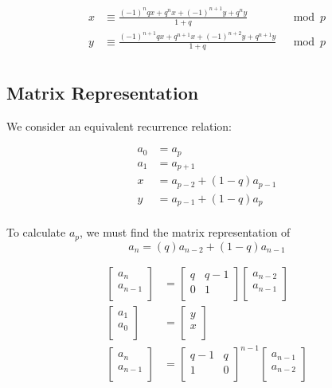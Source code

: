 \documentclass[paper.tex]{subfiles}
\begin{document}
\begin{align*}
	x &\equiv \frac{(-1)^nqx+q^nx+(-1)^{n+1}y+q^ny}{1+q} & \mod{p} \\
	y &\equiv \frac{(-1)^{n+1}qx+q^{n+1}x+(-1)^{n+2}y+q^{n+1}y}{1+q} & \mod{p} \\
\end{align*}

\subsection{Matrix Representation}

We consider an equivalent recurrence relation:

\begin{align*}
	a_{0} &= a_{p} \\
	a_{1} &= a_{p+1} \\
	x &= a_{p-2} + (1-q)a_{p-1} \\
	y &= a_{p-1} + (1-q)a_{p} \\
\end{align*}

To calculate $a_{p}$, we must find the matrix representation of
$$ a_{n} = (q)a_{n-2} + (1-q)a_{n-1} $$

\begin{align*}
\left[ \begin{array}{ccc}
a_{n} \\
a_{n-1} \\
\end{array} \right] 
&=
\left[ \begin{array}{ccc}
q & q-1 \\
0 & 1 \\
\end{array} \right]
\left[ \begin{array}{ccc}
 a_{n-2}\\
a_{n-1} \\
\end{array} \right] \\
\left[ \begin{array}{ccc}
a_{1} \\
a_{0} \\
\end{array} \right] 
&=
\left[ \begin{array}{ccc}
y \\
x \\
\end{array} \right] \\
\left[ \begin{array}{ccc}
a_{n} \\
a_{n-1} \\
\end{array} \right] 
&=
\left[ \begin{array}{ccc}
q-1 & q \\
1 & 0 \\
\end{array} \right] ^{n-1}
\left[ \begin{array}{ccc}
 a_{n-1}\\
a_{n-2} \\
\end{array} \right]
\end{align*}
\end{document}
